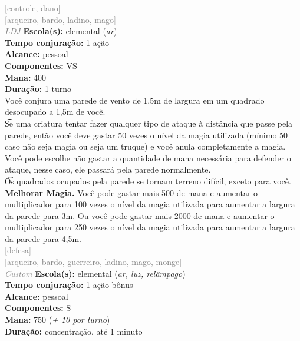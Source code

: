 \documentclass{RPG_Adventure}[2021/10/20]
\begin{document}
{\scriptsize \textcolor{gray}{[controle, dano]\\}}
{\scriptsize \textcolor{gray}{[arqueiro, bardo, ladino, mago]\\}}
{\tiny \textcolor{gray}{\textit{LDJ}}}\jump{}
{\small \t \textbf{Escola(s):} elemental (\textit{ar})\\\t \textbf{Tempo conjuração:} 1 ação\\\t \textbf{Alcance:} pessoal\\\t \textbf{Componentes:} VS\\\t \textbf{Mana:} 400\\\t \textbf{Duração:} 1 turno\\}
{\normalsize Você conjura uma parede de vento de 1,5m de largura em um quadrado desocupado a 1,5m de você.\\\t Se uma criatura tentar fazer qualquer tipo de ataque à distância que passe pela parede, então você deve gastar 50 vezes o nível da magia utilizada (mínimo 50 caso não seja magia ou seja um truque) e você anula completamente a magia. Você pode escolhe não gastar a quantidade de mana necessária para defender o ataque, nesse caso, ele passará pela parede normalmente.\\\t Os quadrados ocupados pela parede se tornam terreno difícil, exceto para você.\\\t \textbf{Melhorar Magia.} Você pode gastar mais 500 de mana e aumentar o multiplicador para 100 vezes o nível da magia utilizada para aumentar a largura da parede para 3m. Ou você pode gastar mais 2000 de mana e aumentar o multiplicador para 250 vezes o nível da magia utilizada para aumentar a largura da parede para 4,5m.\\}
{\scriptsize \textcolor{gray}{[defesa]\\}}
{\scriptsize \textcolor{gray}{[arqueiro, bardo, guerreiro, ladino, mago, monge]\\}}
{\tiny \textcolor{gray}{\textit{Custom}}}\jump{}
{\small \t \textbf{Escola(s):} elemental (\textit{ar, luz, relâmpago})\\\t \textbf{Tempo conjuração:} 1 ação bônus\\\t \textbf{Alcance:} pessoal\\\t \textbf{Componentes:} S\\\t \textbf{Mana:} 750 (\textit{+ 10 por turno})\\\t \textbf{Duração:} concentração, até 1 minuto\\}
\end{document}
